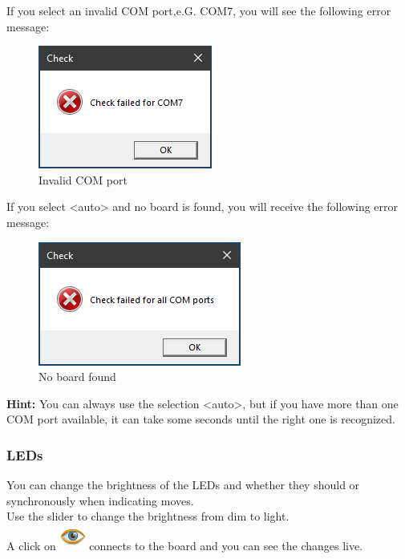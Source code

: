 \documentclass[11pt,a4paper]{article}
\begin{document}
If you select an invalid COM port,e.G. COM7, you will see the following error message:

\begin{figure}[H]
	\centering
	\includegraphics[scale=1.0]{MillenniumChessLink4.png}
	\caption{Invalid COM port }
	\label{fig:MillenniumChessLink4}
\end{figure}

If you select <auto> and no board is found, you will receive the following error message:

\begin{figure}[H]
	\centering
	\includegraphics[scale=1.0]{MillenniumChessLink5.png}
	\caption{No board found }
	\label{fig:MillenniumChessLink5}
\end{figure}

\textbf{Hint:} You can always use the selection <auto>, but if you have more than one COM port available, it can take some seconds until the right one is recognized.\\

\subsubsection{LEDs}
You can change the brightness of the LEDs and whether they should or synchronously when indicating moves.\\
Use the slider to change the brightness from dim to light.\\
A click on \includegraphics[scale=0.4]{eye.png} connects to the board and you can see the changes live.
\end{document}
